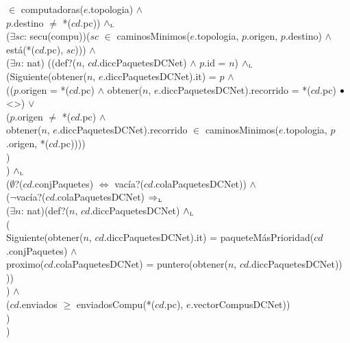 {		$\in$ computadoras($e$.topologia) $\land$ \\
	\- \- \- \- $p$.destino $\neq$ *($cd$.pc)) $\land_{\mathrm{\scriptscriptstyle{L}}}$ \\
	\- \- \- \- ($\exists sc$: secu(compu))($sc$ $\in$
		caminosMinimos($e$.topologia, $p$.origen, $p$.destino) $\land$
		está(*($cd$.pc), $sc$))) $\land$ \\
	\- \- \- \- ($\exists n$: nat)
		((def?($n$, $cd$.diccPaquetesDCNet) $\land$ $p$.id = $n$) $\land_{\mathrm{\scriptscriptstyle{L}}}$ \\
	\- \- \- \- (Siguiente(obtener($n$, $e$.diccPaquetesDCNet).it) = $p$ $\land$ \\
	\- \- \- \- (($p$.origen = *($cd$.pc) $\land$ obtener($n$,
		$e$.diccPaquetesDCNet).recorrido = *($cd$.pc) $\bullet$ <>) $\lor$ \\
	\- \- \- \- ($p$.origen $\neq$ *($cd$.pc) $\land$ \\
	\- \- \- \- obtener($n$, $e$.diccPaquetesDCNet).recorrido $\in$
		caminosMinimos($e$.topologia, $p$.origen, *($cd$.pc)))) \\
	\- \- \- ) \\
	\- \- ) $\land_{\mathrm{\scriptscriptstyle{L}}}$ \\
	\- \- ($\emptyset$?($cd$.conjPaquetes) $\Leftrightarrow$
		vacía?($cd$.colaPaquetesDCNet)) $\land$ \\
	\- \- ($\neg$vacía?($cd$.colaPaquetesDCNet) $\Rightarrow_{\mathrm{\scriptscriptstyle{L}}}$ \\
	\- \- \- ($\exists n$: nat)(def?($n$, $cd$.diccPaquetesDCNet) $\land_{\mathrm{\scriptscriptstyle{L}}}$ \\
	\- \- \- ( \\
	\- \- \- \- Siguiente(obtener($n$, $cd$.diccPaquetesDCNet).it) = paqueteMásPrioridad($cd$.conjPaquetes) $\land$ \\
	\- \- \- \- proximo($cd$.colaPaquetesDCNet) = puntero(obtener($n$,
		$cd$.diccPaquetesDCNet)) \\
	\- \- \- )) \\
	\- \- ) $\land$ \\
	\- \- ($cd$.enviados $\geq$ enviadosCompu(*($cd$.pc), $e$.vectorCompusDCNet)) \\
	\- ) \\
	)
}\mbox{}


